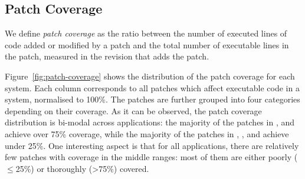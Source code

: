 \subsection{Patch Coverage}
\label{sec:pcoverage}
\label{sec:lpcoverage}


We define {\em patch coverage} as the ratio between the number of
executed lines of code added or modified by a patch and the total
number of executable lines in the patch, measured in the revision that
adds the patch.

Figure~\ref{fig:patch-coverage} shows the distribution of the patch coverage for each
system. Each column corresponds to all patches which affect executable
code in a system, normalised to 100\%. The patches are further grouped into
four categories depending on their coverage.
As it can be observed, the patch coverage distribution is
bi-modal across applications: the majority of the patches
in \git, \memcached and \zeromq achieve over 75\% coverage, while the
majority of the patches in \beanstalkd, \binutils, \lighttpdtwo and \redis achieve
under 25\%.  One interesting aspect is that for all applications,
there are relatively few patches with coverage in the middle ranges:
most of them are either poorly ($\le$25\%) or thoroughly (\textgreater75\%)
covered.

